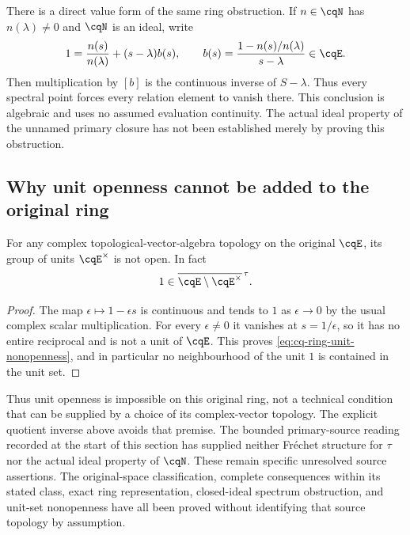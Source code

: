 There is a direct value form of the same ring obstruction.
If $n\in\cqN$ has $n(\lambda)\ne0$ and $\cqN$ is an
ideal, write
\[
 1=\frac{n(s)}{n(\lambda)}+(s-\lambda)b(s),\qquad
 b(s)=\frac{1-n(s)/n(\lambda)}{s-\lambda}\in\cqE.
\]
Then multiplication by $[b]$ is the continuous inverse of
$S-\lambda$. Thus every spectral point forces every
relation element to vanish there. This conclusion is
algebraic and uses no assumed evaluation continuity.
The actual ideal property of the unnamed primary closure
has not been established merely by proving this obstruction.

\subsection{Why unit openness cannot be added to the original ring}

\begin{cqproposition}
\label{thm:cq-ring-unit-nonopenness}
For any complex topological-vector-algebra topology on
the original $\cqE$, its group of units $\cqE^\times$
is not open. In fact
\begin{equation}
 1\in\overline{\cqE\setminus\cqE^\times}^{\,\tau}.
 \label{eq:cq-ring-unit-nonopenness}
\end{equation}
\end{cqproposition}
\begin{proof}
The map $\epsilon\mapsto1-\epsilon s$ is continuous and
tends to $1$ as $\epsilon\to0$ by the usual complex
scalar multiplication. For every $\epsilon\ne0$ it
vanishes at $s=1/\epsilon$, so it has no entire reciprocal
and is not a unit of $\cqE$. This proves
\eqref{eq:cq-ring-unit-nonopenness}, and in particular
no neighbourhood of the unit $1$ is contained in the unit set.
\end{proof}

Thus unit openness is impossible on this original ring,
not a technical condition that can be supplied by a
choice of its complex-vector topology. The explicit
quotient inverse above avoids that premise.
The bounded primary-source reading recorded at the
start of this section has supplied neither Fr\'echet
structure for $\tau$ nor the actual ideal property of
$\cqN$. These remain specific unresolved source assertions.
The original-space classification, complete consequences
within its stated class, exact ring representation,
closed-ideal spectrum obstruction, and unit-set
nonopenness have all been proved without identifying
that source topology by assumption.

